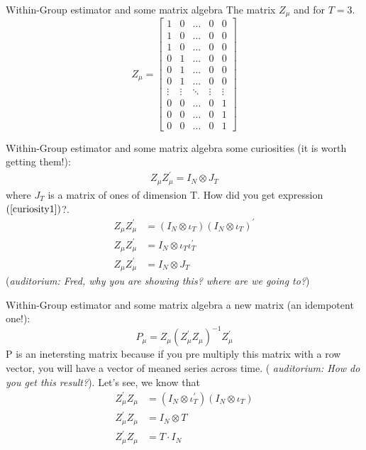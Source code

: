 \begin{frame}{Within-Group estimator and some matrix algebra}
	The matrix $Z_{\mu }$ and for $T=3.$
		$$ Z_{\mu} = \left[	\begin{array}{ccccc}
								1 & 0 & \ldots & 0 & 0 \\ 
								1 & 0 & \ldots & 0 & 0 \\ 
								1 & 0 & \ldots & 0 & 0 \\ 
								0 & 1 & \ldots & 0 & 0 \\ 
								0 & 1 & \ldots & 0 & 0 \\ 
								0 & 1 & \ldots & 0 & 0 \\ 
								\vdots & \vdots & \ddots & \vdots & \vdots \\ 
								0 & 0 & \ldots & 0 & 1 \\ 
								0 & 0 & \ldots & 0 & 1 \\ 
								0 & 0 & \ldots & 0 & 1
				     		\end{array} 
				     \right]$$
\end{frame}
\begin{frame}{Within-Group estimator and some matrix algebra}
	some curiosities (it is worth getting them!):%
		\begin{gather}
			Z_{\mu }Z_{\mu }^{\prime }=I_{N}\otimes J_{T}  \label{curiosity1}
		\end{gather}
	where $J_{T}$ is a matrix of ones of dimension T. How did you get expression $\left( \ref{curiosity1}\right)$?.
		\begin{align*}
			Z_{\mu }Z_{\mu }^{\prime } &= \left( I_{N}\otimes \iota _{T}\right) \left(
			I_{N}\otimes \iota _{T}\right) ^{\prime } \\
			Z_{\mu }Z_{\mu }^{\prime } &= I_{N}\otimes \iota _{T}\iota _{T}^{\prime } \\
			Z_{\mu }Z_{\mu }^{\prime } &= I_{N}\otimes J_{T}
		\end{align*}
	(\emph{auditorium: Fred, why you are showing this? where are we going to?})
\end{frame}
\begin{frame}{Within-Group estimator and some matrix algebra}
	a new matrix (an idempotent one!):
		$$P_{\mu }=Z_{\mu }\left( Z_{\mu }^{\prime }Z_{\mu }\right) ^{-1}Z_{\mu}^{\prime }$$
	P is an inetersting matrix because if you pre multiply this matrix with a row vector, you will have a vector of meaned series across time. (\emph{ auditorium: How do you get this result?}). Let's see, we know that
		\begin{align*}
			Z_{\mu}^{\prime}Z_{\mu} & = \left(I_{N}\otimes \iota_{T}^{\prime}\right) \left(I_{N}\otimes \iota_{T}\right) \\
			Z_{\mu}^{\prime}Z_{\mu} & = I_{N}\otimes T \\
			Z_{\mu}^{\prime}Z_{\mu} & = T\cdot I_{N}
		\end{align*}
\end{frame}
